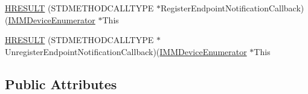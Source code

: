 \begin{DoxyCompactItemize}
\item 
\hyperlink{struct_i_m_m_device_enumerator_vtbl_a3ef2a07dbb0028f5ae4616f1a5f8eac4}{H\+R\+E\+S\+U\+LT} (S\+T\+D\+M\+E\+T\+H\+O\+D\+C\+A\+L\+L\+T\+Y\+PE $\ast$Register\+Endpoint\+Notification\+Callback)(\hyperlink{mmdeviceapi_8h_a105bf1359b5d6cd4fb24828cc6ab2874}{I\+M\+M\+Device\+Enumerator} $\ast$This
\item 
\hyperlink{struct_i_m_m_device_enumerator_vtbl_af7b2e939112fa71d61c781d990804081}{H\+R\+E\+S\+U\+LT} (S\+T\+D\+M\+E\+T\+H\+O\+D\+C\+A\+L\+L\+T\+Y\+PE $\ast$Unregister\+Endpoint\+Notification\+Callback)(\hyperlink{mmdeviceapi_8h_a105bf1359b5d6cd4fb24828cc6ab2874}{I\+M\+M\+Device\+Enumerator} $\ast$This
\end{DoxyCompactItemize}
\subsection*{Public Attributes}
